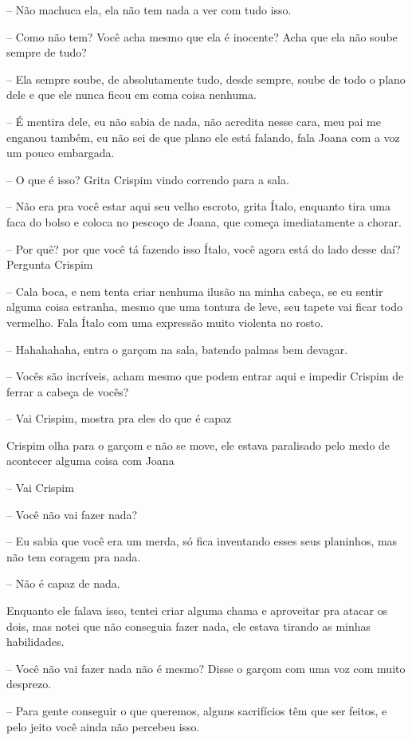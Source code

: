 -- Não machuca ela, ela não tem nada a ver com tudo isso.

-- Como não tem? Você acha mesmo que ela é inocente? Acha que ela não soube sempre de tudo?

-- Ela sempre soube, de absolutamente tudo, desde sempre, soube de todo o plano dele e que ele nunca ficou em coma coisa nenhuma.

-- É mentira dele, eu não sabia de nada, não acredita nesse cara, meu pai me enganou também, eu não sei de que plano ele está falando, fala Joana com a voz um pouco embargada.

-- O que é isso? Grita Crispim vindo correndo para a sala.

-- Não era pra você estar aqui seu velho escroto, grita Ítalo, enquanto tira uma faca do bolso e coloca no pescoço de Joana, que começa imediatamente a chorar.

-- Por quê? por que você tá fazendo isso Ítalo, você agora está do lado desse daí? Pergunta Crispim

-- Cala boca, e nem tenta criar nenhuma ilusão na minha cabeça, se eu sentir alguma coisa estranha, mesmo que uma tontura de leve, seu tapete vai ficar todo vermelho. Fala Ítalo com uma expressão muito violenta no rosto.

-- Hahahahaha, entra o garçom na sala, batendo palmas bem devagar.

-- Vocês são incríveis, acham mesmo que podem entrar aqui e impedir Crispim de ferrar a cabeça de vocês?

-- Vai Crispim, mostra pra eles do que é capaz

Crispim olha para o garçom e não se move, ele estava paralisado pelo medo de acontecer alguma coisa com Joana

-- Vai Crispim

-- Você não vai fazer nada?

-- Eu sabia que você era um merda, só fica inventando esses seus planinhos, mas não tem coragem pra nada.

-- Não é capaz de nada.

Enquanto ele falava isso, tentei criar alguma chama e aproveitar pra atacar os dois, mas notei que não conseguia fazer nada, ele estava tirando as minhas habilidades. 

-- Você não vai fazer nada não é mesmo? Disse o garçom com uma voz com muito desprezo.

-- Para gente conseguir o que queremos, alguns sacrifícios têm que ser feitos, e pelo jeito você ainda não percebeu isso.


